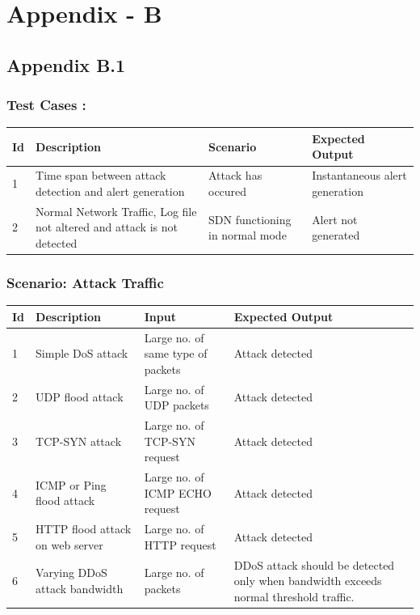 \documentclass[12pt,a4paper,final]{report}
\DeclareRobustCommand{\gobblefive}[5]{}
\newcommand*{\SkipTocEntry}{\addtocontents{toc}{\gobblefive}}
\begin{document}
\SkipTocEntry\chapter{Appendix - B}
\thispagestyle{empty}
\newpage

\SkipTocEntry\section{Appendix B.1}
\SkipTocEntry\subsection{Test Cases :}
\begin{center}
\begin{tabular}{|p{1cm}|p{3cm}|p{3cm}|p{3.5cm}|}
\hline 
 \textbf{Id} & \textbf{Description} & \textbf{Scenario} & \textbf{Expected Output} \\ 
\hline 
 1 & Time span between attack detection and alert generation & Attack has occured & Instantaneous alert generation\\
 \hline
 2 & Normal Network Traffic, Log file not altered and attack is not detected & SDN functioning in normal mode & Alert not generated\\ 
\hline 
\end{tabular} 
\end{center}

\SkipTocEntry\subsection{Scenario: Attack Traffic}
\begin{center}
\begin{tabular}{|p{1cm}|p{3cm}|p{3cm}|p{3.5cm}|}
\hline 
 \textbf{Id} & \textbf{Description} & \textbf{Input} & \textbf{Expected Output} \\ 
\hline 
 1 & Simple DoS attack & Large no. of same type of packets & Attack detected\\
 \hline
 2 & UDP flood attack & Large no. of UDP packets & Attack detected\\ 
 \hline
 3 & TCP-SYN attack & Large no. of TCP-SYN request & Attack detected\\
 \hline
 4 & ICMP or Ping flood attack & Large no. of ICMP ECHO request & Attack detected\\
 \hline
 5 & HTTP flood attack on web server & Large no. of HTTP request & Attack detected\\
 \hline
 6 & Varying DDoS attack bandwidth & Large no. of packets & DDoS attack should be detected only when bandwidth exceeds normal threshold traffic. \\
\hline 
\end{tabular} 
\end{center}
\end{document}
